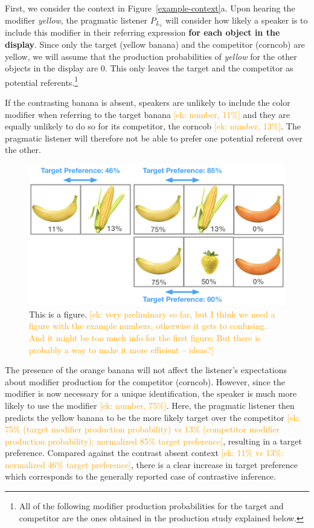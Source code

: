 \documentclass[10pt,letterpaper]{article}
\newcommand{\ek}[1]{\textcolor{Orange}{[ek: #1]}}
\begin{document}
First, we consider the context in Figure~\ref{example-context}a. Upon hearing the modifier \textit{yellow}, the pragmatic listener $P_{L_1}$ will consider how likely a speaker is to include this modifier in their referring expression \textbf{for each object in the display}. Since only the target (yellow banana) and the competitor (corncob) are yellow, we will assume that the production probabilities of \textit{yellow} for the other objects in the display are 0. This only leaves the target and the competitor as potential referents.\footnote{All of the following modifier production probabilities for the target and competitor are the ones obtained in the production study explained below.}

If the contrasting banana is absent, speakers are unlikely to include the color modifier when referring to the target banana \ek{number, 11\%} and they are equally unlikely to do so for its competitor, the corncob \ek{number, 13\%}. The pragmatic listener will therefore not be able to prefer one potential referent over the other.

\begin{figure}
	\begin{center}
		\includegraphics[width=.475\textwidth]{graphs/target-pref.pdf}
	\end{center}
\caption{This is a figure. \ek{very preliminary so far, but I think we need a figure with the example numbers, otherwise it gets to confusing. And it might be too much info for the first figure; But there is probably a way to make it more efficient -- ideas?}} 
\label{target-pref}
\end{figure}

The presence of the orange banana will not affect the listener's expectations about modifier production for the competitor (corncob). However, since the modifier is now necessary for a unique identification, the speaker is much more likely to use the modifier \ek{number, 75\%}. Here, the pragmatic listener then predicts the yellow banana to be the more likely target over the competitor \ek{75\% (target modifier production probability) vs 13\% (competitor modifier production probability); normalized 85\% target preference}, resulting in a target preference. Compared against the contrast absent context \ek{11\% vs 13\%: normalized 46\% target preference}, there is a clear increase in target preference which corresponds to the generally reported case of contrastive inference.
\end{document}
